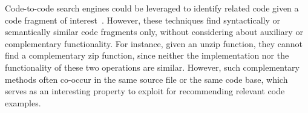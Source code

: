 
 
Code-to-code search engines could be leveraged to identify related code given a code 
fragment of interest~\cite{kim2018Facoy, krugle, searchcode}. 
However, these techniques find syntactically or semantically similar code fragments 
only, without considering about auxiliary or complementary functionality. 
For instance, given an unzip function, they cannot find a complementary zip function, since neither
the implementation nor the functionality of these two operations are similar. However, 
such complementary methods often co-occur in the same source file or the same code base, which serves as 
an interesting property to exploit for recommending relevant code examples.



